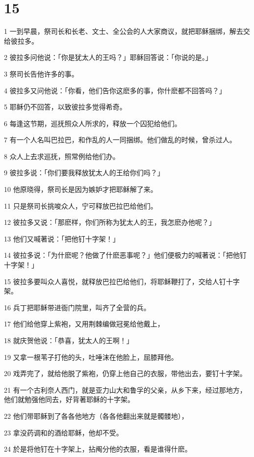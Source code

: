 \chapter{15}

\par 1 一到早晨，祭司长和长老、文士、全公会的人大家商议，就把耶稣捆绑，解去交给彼拉多。
\par 2 彼拉多问他说：「你是犹太人的王吗？」耶稣回答说：「你说的是。」
\par 3 祭司长告他许多的事。
\par 4 彼拉多又问他说：「你看，他们告你这麽多的事，你什麽都不回答吗？」
\par 5 耶稣仍不回答，以致彼拉多觉得希奇。
\par 6 每逢这节期，巡抚照众人所求的，释放一个囚犯给他们。
\par 7 有一个人名叫巴拉巴，和作乱的人一同捆绑。他们做乱的时候，曾杀过人。
\par 8 众人上去求巡抚，照常例给他们办。
\par 9 彼拉多说：「你们要我释放犹太人的王给你们吗？」
\par 10 他原晓得，祭司长是因为嫉妒才把耶稣解了来。
\par 11 只是祭司长挑唆众人，宁可释放巴拉巴给他们。
\par 12 彼拉多又说：「那麽样，你们所称为犹太人的王，我怎麽办他呢？」
\par 13 他们又喊著说：「把他钉十字架！」
\par 14 彼拉多说：「为什麽呢？他做了什麽恶事呢？」他们便极力的喊著说：「把他钉十字架！」
\par 15 彼拉多要叫众人喜悦，就释放巴拉巴给他们，将耶稣鞭打了，交给人钉十字架。
\par 16 兵丁把耶稣带进衙门院里，叫齐了全营的兵。
\par 17 他们给他穿上紫袍，又用荆棘编做冠冕给他戴上，
\par 18 就庆贺他说：「恭喜，犹太人的王啊！」
\par 19 又拿一根苇子打他的头，吐唾沫在他脸上，屈膝拜他。
\par 20 戏弄完了，就给他脱了紫袍，仍穿上他自己的衣服，带他出去，要钉十字架。
\par 21 有一个古利奈人西门，就是亚力山大和鲁孚的父亲，从乡下来，经过那地方，他们就勉强他同去，好背著耶稣的十字架。
\par 22 他们带耶稣到了各各他地方（各各他翻出来就是髑髅地），
\par 23 拿没药调和的酒给耶稣，他却不受。
\par 24 於是将他钉在十字架上，拈阄分他的衣服，看是谁得什麽。
